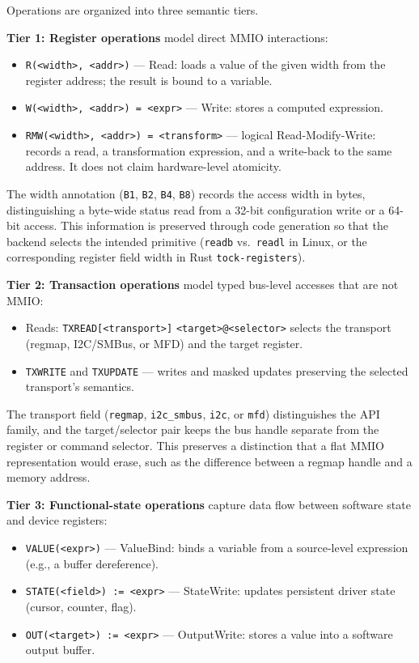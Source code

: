 Operations are organized into three semantic tiers.

\textbf{Tier 1: Register operations} model direct MMIO interactions:

\begin{itemize}
\item \texttt{R(<width>, <addr>)} --- Read: loads a value of the given width from the register address; the result is bound to a variable.
\item \texttt{W(<width>, <addr>) = <expr>} --- Write: stores a computed expression.
\item \texttt{RMW(<width>, <addr>) = <transform>} --- logical Read-Modify-Write: records a read, a transformation expression, and a write-back to the same address. It does not claim hardware-level atomicity.
\end{itemize}

The width annotation (\texttt{B1}, \texttt{B2}, \texttt{B4}, \texttt{B8}) records
the access width in bytes, distinguishing a byte-wide status read from a
32-bit configuration write or a 64-bit access. This information is preserved
through code generation so that the backend selects the intended primitive
(\texttt{readb} vs.\ \texttt{readl} in Linux, or the corresponding register
field width in Rust \texttt{tock-registers}).

\textbf{Tier 2: Transaction operations} model typed bus-level accesses that are not MMIO:

\begin{itemize}
\item Reads: \texttt{TXREAD[<transport>]} \texttt{<target>@<selector>} selects the transport (regmap, I2C/SMBus, or MFD) and the target register.
\item \texttt{TXWRITE} and \texttt{TXUPDATE} --- writes and masked updates preserving the selected transport's semantics.
\end{itemize}

The transport field (\texttt{regmap}, \texttt{i2c\_smbus}, \texttt{i2c}, or \texttt{mfd}) distinguishes the API family, and the target/selector pair keeps the bus handle separate from the register or command selector. This preserves a distinction that a flat MMIO representation would erase, such as the difference between a regmap handle and a memory address.

\textbf{Tier 3: Functional-state operations} capture data flow between software state and device registers:

\begin{itemize}
\item \texttt{VALUE(<expr>)} --- ValueBind: binds a variable from a source-level expression (e.g., a buffer dereference).
\item \texttt{STATE(<field>) := <expr>} --- StateWrite: updates persistent driver state (cursor, counter, flag).
\item \texttt{OUT(<target>) := <expr>} --- OutputWrite: stores a value into a software output buffer.
\end{itemize}

